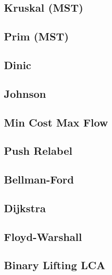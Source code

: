 \subsection{Kruskal (MST)}
\raggedbottom
\hrulefill
\subsection{Prim (MST)}
\raggedbottom
\hrulefill
\subsection{Dinic}
\raggedbottom
\hrulefill
\subsection{Johnson}
\raggedbottom
\hrulefill
\subsection{Min Cost Max Flow}
\raggedbottom
\hrulefill
\subsection{Push Relabel}
\raggedbottom
\hrulefill
\subsection{Bellman-Ford}
\raggedbottom
\hrulefill
\subsection{Dijkstra}
\raggedbottom
\hrulefill
\subsection{Floyd-Warshall}
\raggedbottom
\hrulefill
\subsection{Binary Lifting LCA}
\raggedbottom
\hrulefill

